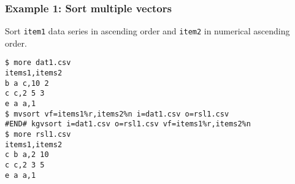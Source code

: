 \subsubsection*{Example 1: Sort multiple vectors}

Sort \verb|item1| data series in ascending order and \verb|item2| in numerical ascending order.   


\begin{Verbatim}[baselinestretch=0.7,frame=single]
$ more dat1.csv
items1,items2
b a c,10 2
c c,2 5 3
e a a,1
$ mvsort vf=items1%r,items2%n i=dat1.csv o=rsl1.csv
#END# kgvsort i=dat1.csv o=rsl1.csv vf=items1%r,items2%n
$ more rsl1.csv
items1,items2
c b a,2 10
c c,2 3 5
e a a,1
\end{Verbatim}
